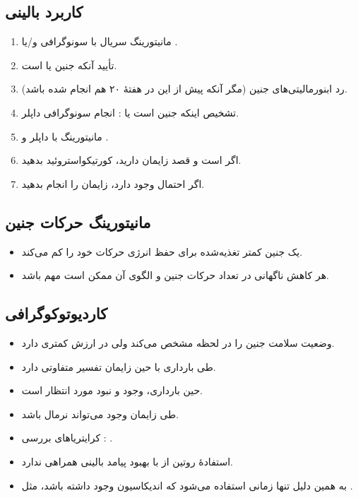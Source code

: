 \documentclass[12pt,a4paper]{article}
\begin{document}
\subsection*{کاربرد بالینی}
\begin{enumerate}
\item مانیتورینگ سریال با سونوگرافی و/یا .
\item تأیید آنکه جنین  یا  است.
\item رد ابنورمالیتی‌های جنین (مگر آنکه پیش از این در هفتهٔ ۲۰ هم انجام شده باشد).
\item تشخیص اینکه جنین  است یا : انجام سونوگرافی داپلر.
\item مانیتورینگ با داپلر و .
\item اگر  است و قصد زایمان دارید، کورتیکواستروئید بدهید.
\item اگر احتمال  وجود دارد، زایمان را انجام بدهید.
\end{enumerate}

\subsection*{مانیتورینگ حرکات جنین}
\begin{itemize}
\item یک جنین کمتر تغذیه‌شده برای حفظ انرژی حرکات خود را کم می‌کند.
\item هر کاهش ناگهانی در تعداد حرکات جنین و الگوی آن ممکن است مهم باشد.
\end{itemize}

\subsection*{کاردیوتوکوگرافی }
\begin{itemize}
\item وضعیت سلامت جنین را در لحظه مشخص می‌کند ولی در  ارزش کمتری دارد.
\item {} طی بارداری با  حین زایمان تفسیر متفاوتی دارد.
\item حین بارداری، وجود  و نبود  مورد انتظار است.
\item طی زایمان وجود  می‌تواند نرمال باشد.
\item کرایتریاهای بررسی : .
\item استفادهٔ روتین از  با بهبود پیامد بالینی همراهی ندارد.
\item به همین دلیل تنها زمانی استفاده می‌شود که اندیکاسیون وجود داشته باشد، مثل .
\end{itemize}
\end{document}
